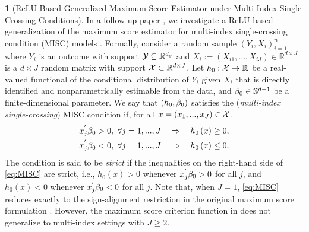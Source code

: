 \documentclass[12pt,american]{article}
\theoremstyle{definition}
\newtheorem{example}{\protect\examplename}
\theoremstyle{plain}
\theoremstyle{definition}
\theoremstyle{plain}
\theoremstyle{plain}
\theoremstyle{plain}
\theoremstyle{plain}
\theoremstyle{plain}
\newcommand{\R}{\mathbb{R}}
\providecommand{\examplename}{Example}
\providecommand{\examplename}{Example}
\begin{document}
%
\begin{example}[ReLU-Based Generalized Maximum Score Estimator under Multi-Index Single-Crossing Conditions]\label{exa:RMS} In a follow-up paper \citep*{CGW2025}, we investigate a ReLU-based generalization of the maximum score estimator for multi-index single-crossing condition (MISC) models \citep{gao2019robust}.
  Formally, consider a random sample $\left(Y_{i},X_{i}\right)_{i=1}^{n}$
  where $Y_{i}$ is an outcome with support ${\cal Y}\subseteq\R^{d_{y}}$
  and $X_{i}:=\left(X_{i1},...,X_{iJ}\right)\in\R^{d\times J}$ is a $d\times J$ random matrix with support ${\cal X}\subset\R^{d\times J}$.
  Let $h_{0}:{\cal X}\to\R$ be a real-valued functional of the conditional
  distribution of $Y_{i}$ given $X_{i}$ that is directly identified
  and nonparametrically estimable from the data, and $\beta_{0}\in \mathbb{S}^{d-1}$ be a finite-dimensional parameter.
  We say that $\left(h_{0},\beta_{0}\right)$ satisfies the (\emph{multi-index
  single-crossing}) MISC condition if, for all $x=\left(x_{1},...,x_{J}\right)\in{\cal X}$,
  \begin{align}
    x_{j}^{'}\beta_{0}>0,\ \forall j=1,...,J & \quad\Rightarrow\quad h_{0}\left(x\right)\geq0,\nonumber \\
    x_{j}^{'}\beta_{0}<0,\ \forall j=1,...,J & \quad\Rightarrow\quad h_{0}\left(x\right)\leq0.\label{eq:MISC}
  \end{align}
  The condition is said to be \emph{strict} if the inequalities on the
  right-hand side of \eqref{eq:MISC} are strict, i.e., $h_{0}\left(x\right)>0$ whenever $x_{j}^{'}\beta_{0}>0$
  for all $j$, and $h_{0}\left(x\right)<0$ whenever $x_{j}^{'}\beta_{0}<0$
  for all $j$. Note that, when $J=1$, \eqref{eq:MISC} reduces exactly to the sign-alignment restriction in the original maximum score formulation \citep{manski1975maximum,manski1985semiparametric}. However, the maximum score criterion function in \citep{manski1975maximum,manski1985semiparametric} does not generalize to multi-index settings with $J\geq2$.


\end{example}
\end{document}
